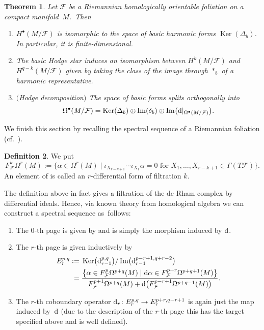 \documentclass[10pt,a4paper]{amsart}
\numberwithin{equation}{section}
\newtheorem{tw}{Theorem}[section]
\theoremstyle{definition}
\newtheorem{defi}[tw]{Definition}
\begin{document}
\begin{tw}\label{HD} Let $\mathcal{F}$ be a Riemannian homologically orientable foliation on a compact manifold~$M$.~Then
\begin{enumerate}\itemsep=0pt
\item[$1.$] $H^{\bullet}(M\slash\mathcal{F})$ is isomorphic to the space of basic harmonic forms $\operatorname{Ker}(\Delta_b)$. In particular, it is finite-dimensional.
\item[$2.$] The basic Hodge star induces an isomorphism between $H^{k}(M\slash\mathcal{F})$ and $H^{q-k}(M\slash\mathcal{F})$ given by taking the class of the image through $*_b$ of a harmonic representative.
\item[$3.$] $($Hodge decomposition$)$ The space of basic forms splits orthogonally into
\[\Omega^{\bullet}(M\slash\mathcal{F})=\operatorname{Ker}(\Delta_b)\oplus \operatorname{Im}(\delta_b)\oplus \operatorname{Im}\bigl({\rm d}|_{\Omega^{\bullet}(M\slash\mathcal{F})}\bigr).\]
\end{enumerate}
\end{tw}
We finish this section by recalling the spectral sequence of a Riemannian foliation (cf.~\cite{ss1,ss2,ss3}).
\begin{defi}%
We put
\[F^k_{\mathcal{F}}\Omega^r(M):=\{\alpha\in\Omega^r(M)\mid \iota_{X_{r-k+1}}\cdots \iota_{X_1}\alpha=0\text{ for } X_1,\dots,X_{r-k+1}\in\Gamma(T\mathcal{F})\}.\]
An element of  is called an $r$-differential form of filtration $k$.
\end{defi}
The definition above in fact gives a filtration of the de Rham complex by differential ideals. Hence, via known theory from homological algebra we can construct a spectral sequence as~follows:
\begin{enumerate}\itemsep=0pt
\item The $0$-th page is given by  and  is simply the morphism induced by ${\rm d}$.
\item The $r$-th page is given inductively by
\begin{align*}
E_{r}^{p,q}:={}&\operatorname{Ker}\bigl({\rm d}^{p,q}_{r-1}\bigr)\slash \operatorname{Im}\bigl({\rm d}^{p-r+1,q+r-2}_{r-1}\bigr)\\
={}&\frac{\bigl\{\alpha\in F^{p}_{\mathcal{F}}\Omega^{p+q}(M)\mid {\rm d}\alpha\in F_{\mathcal{F}}^{p+r}\Omega^{p+q+1}(M)\bigr\}}{F^{p+1}_{\mathcal{F}} \Omega^{p+q}(M)+{\rm d}\bigl(F_{\mathcal{F}}^{p-r+1}\Omega^{p+q-1}(M)\bigr)}.
\end{align*}
\item The $r$-th coboundary operator ${\rm d}_r\colon E_r^{p,q}\to E^{p+r,q-r+1}_r$ is again just the map induced by~${\rm d}$ (due to the description of the $r$-th page this has the target specified above and is well defined).
\end{enumerate}
\end{document}
